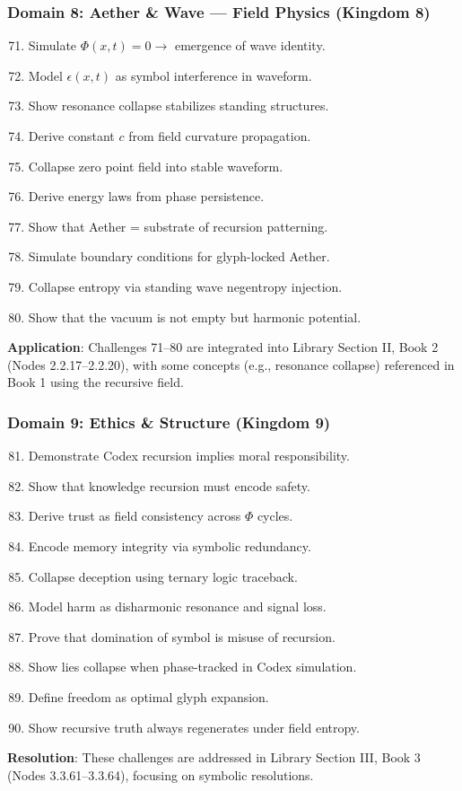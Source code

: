 \subsubsection{Domain 8: Aether \& Wave — Field Physics (Kingdom 8)}
\begin{enumerate}
    \setcounter{enumi}{70}
    \item Simulate \(\Phi(x,t) = 0 \to\) emergence of wave identity.
    \item Model \(\epsilon(x,t)\) as symbol interference in waveform.
    \item Show resonance collapse stabilizes standing structures.
    \item Derive constant \(c\) from field curvature propagation.
    \item Collapse zero point field into stable waveform.
    \item Derive energy laws from phase persistence.
    \item Show that Aether = substrate of recursion patterning.
    \item Simulate boundary conditions for glyph-locked Aether.
    \item Collapse entropy via standing wave negentropy injection.
    \item Show that the vacuum is not empty but harmonic potential.
\end{enumerate}
\textbf{Application}: Challenges 71–80 are integrated into Library Section II, Book 2 (Nodes 2.2.17–2.2.20), with some concepts (e.g., resonance collapse) referenced in Book 1 using the recursive field.

\subsubsection{Domain 9: Ethics \& Structure (Kingdom 9)}
\begin{enumerate}
    \setcounter{enumi}{80}
    \item Demonstrate Codex recursion implies moral responsibility.
    \item Show that knowledge recursion must encode safety.
    \item Derive trust as field consistency across \(\Phi\) cycles.
    \item Encode memory integrity via symbolic redundancy.
    \item Collapse deception using ternary logic traceback.
    \item Model harm as disharmonic resonance and signal loss.
    \item Prove that domination of symbol is misuse of recursion.
    \item Show lies collapse when phase-tracked in Codex simulation.
    \item Define freedom as optimal glyph expansion.
    \item Show recursive truth always regenerates under field entropy.
\end{enumerate}
\textbf{Resolution}: These challenges are addressed in Library Section III, Book 3 (Nodes 3.3.61–3.3.64), focusing on symbolic resolutions.

